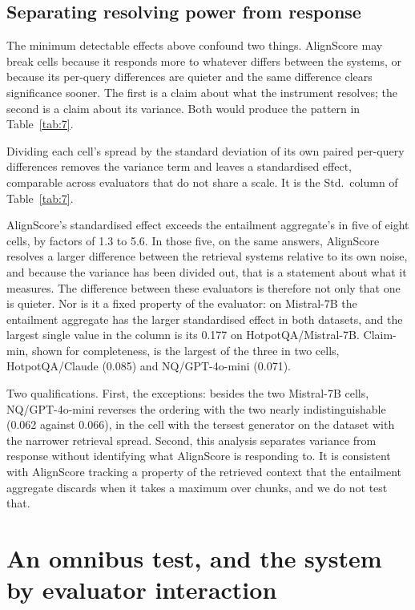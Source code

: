 \documentclass[11pt]{article}
\begin{document}
\subsection{Separating resolving power from response}
\label{app:standardised}

The minimum detectable effects above confound two things. AlignScore may break cells because it responds more to whatever differs between the systems, or because its per-query differences are quieter and the same difference clears significance sooner. The first is a claim about what the instrument resolves; the second is a claim about its variance. Both would produce the pattern in Table~\ref{tab:7}.

Dividing each cell's spread by the standard deviation of its own paired per-query differences removes the variance term and leaves a standardised effect, comparable across evaluators that do not share a scale. It is the Std.\ column of Table~\ref{tab:7}.

AlignScore's standardised effect exceeds the entailment aggregate's in five of eight cells, by factors of 1.3 to 5.6. In those five, on the same answers, AlignScore resolves a larger difference between the retrieval systems relative to its own noise, and because the variance has been divided out, that is a statement about what it measures. The difference between these evaluators is therefore not only that one is quieter. Nor is it a fixed property of the evaluator: on Mistral-7B the entailment aggregate has the larger standardised effect in both datasets, and the largest single value in the column is its 0.177 on HotpotQA/Mistral-7B. Claim-min, shown for completeness, is the largest of the three in two cells, HotpotQA/Claude (0.085) and NQ/GPT-4o-mini (0.071).

Two qualifications. First, the exceptions: besides the two Mistral-7B cells, NQ/GPT-4o-mini reverses the ordering with the two nearly indistinguishable (0.062 against 0.066), in the cell with the tersest generator on the dataset with the narrower retrieval spread. Second, this analysis separates variance from response without identifying what AlignScore is responding to. It is consistent with AlignScore tracking a property of the retrieved context that the entailment aggregate discards when it takes a maximum over chunks, and we do not test that.




\section{An omnibus test, and the system by evaluator interaction}
\label{app:omnibus}
\end{document}
